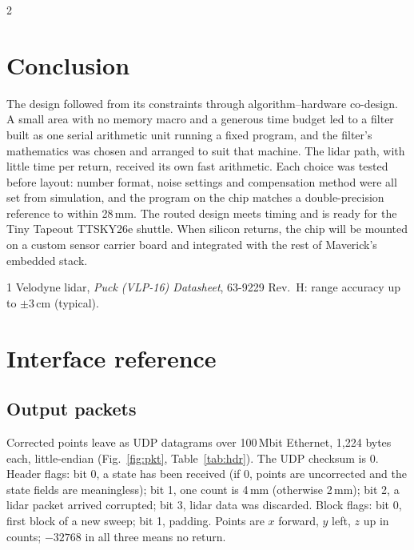 \documentclass[10pt,letterpaper]{article}
\begin{document}
\begin{multicols}{2}
  \section{Conclusion}

  The design followed from its constraints through algorithm--hardware co-design.
  A small area with no memory macro and a generous time budget led to a filter built as one serial arithmetic unit running a fixed program, and the filter's mathematics was chosen and arranged to suit that machine.
  The lidar path, with little time per return, received its own fast arithmetic.
  Each choice was tested before layout: number format, noise settings and compensation method were all set from simulation, and the program on the chip matches a double-precision reference to within 28\,mm.
  The routed design meets timing and is ready for the Tiny Tapeout TTSKY26e shuttle.
  When silicon returns, the chip will be mounted on a custom sensor carrier board and integrated with the rest of Maverick's embedded stack.

  \begin{thebibliography}{1}\footnotesize {} Velodyne lidar, \emph{Puck (VLP-16) Datasheet}, 63-9229 Rev.~H: range accuracy up to $\pm3$\,cm (typical).
  \end{thebibliography}

\end{multicols}
\setlength{\intextsep}{4pt}\setlength{\abovecaptionskip}{3pt}

\appendix
\section{Interface reference}

\subsection{Output packets}

Corrected points leave as UDP datagrams over 100\,Mbit Ethernet, 1,224 bytes each, little-endian (Fig.~\ref{fig:pkt}, Table~\ref{tab:hdr}).
The UDP checksum is 0.
Header flags: bit 0, a state has been received (if 0, points are uncorrected and the state fields are meaningless); bit 1, one count is 4\,mm (otherwise 2\,mm); bit 2, a lidar packet arrived corrupted; bit 3, lidar data was discarded.
Block flags: bit 0, first block of a new sweep; bit 1, padding.
Points are $x$ forward, $y$ left, $z$ up in counts; $-32768$ in all three means no return.
\end{document}
